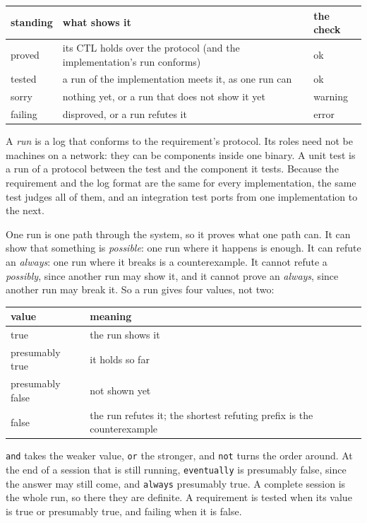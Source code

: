 \begin{center}
\begin{tabular}{@{}lll@{}}
\toprule
standing & what shows it & the check \\
\midrule
proved & its CTL holds over the protocol (and the implementation's run conforms) & ok \\
tested & a run of the implementation meets it, as one run can & ok \\
sorry & nothing yet, or a run that does not show it yet & warning \\
failing & disproved, or a run refutes it & error \\
\bottomrule
\end{tabular}
\end{center}

A \emph{run} is a log that conforms to the requirement's protocol. Its roles need not be
machines on a network: they can be components inside one binary. A unit test is a run of a
protocol between the test and the component it tests. Because the requirement and the log
format are the same for every implementation, the same test judges all of them, and an
integration test ports from one implementation to the next.

One run is one path through the system, so it proves what one path can. It can show that
something is \emph{possible}: one run where it happens is enough. It can refute an
\emph{always}: one run where it breaks is a counterexample. It cannot refute a
\emph{possibly}, since another run may show it, and it cannot prove an \emph{always}, since
another run may break it. So a run gives four values, not two:

\begin{center}
\begin{tabular}{@{}ll@{}}
\toprule
value & meaning \\
\midrule
true & the run shows it \\
presumably true & it holds so far \\
presumably false & not shown yet \\
false & the run refutes it; the shortest refuting prefix is the counterexample \\
\bottomrule
\end{tabular}
\end{center}

\texttt{and} takes the weaker value, \texttt{or} the stronger, and \texttt{not} turns the order
around. At the end of a session that is still running, \texttt{eventually} is presumably false,
since the answer may still come, and \texttt{always} presumably true. A complete session is the
whole run, so there they are definite. A requirement is tested when its value is true or
presumably true, and failing when it is false.

